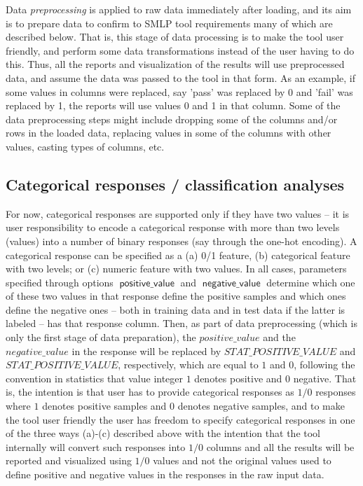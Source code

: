\documentclass[a4paper,parskip=half]{article} %
\newcommand*\option[1]{\operatorname{\mathsf{#1}}} %
\begin{document}
Data \emph{preprocessing} is applied to raw data immediately after loading, and its aim is to prepare
data to confirm to SMLP tool requirements many of which are described below. That is, this
stage of data processing is to make the tool user friendly, and perform some data 
transformations instead of the user having to do this. Thus, all the reports and visualization
of the results will use preprocessed data, and assume the data was passed to the tool in that
form. As an example, if some values in columns were replaced, say 'pass' was replaced by 0
and 'fail' was replaced by 1, the reports will use values 0 and 1 in that column. Some of the 
data preprocessing steps might include dropping some of the columns and/or rows in the loaded
data, replacing values in some of the columns with other values, casting types of columns, etc.

\subsection{Categorical responses / classification analyses}
For now, categorical responses are supported only if they have two values -- it is user 
responsibility to encode a categorical response with more than two levels (values) into
a number of binary responses (say through the one-hot encoding). 
A categorical response can be specified as a (a) 0/1 feature, (b) categorical feature with 
two levels; or (c) numeric feature with two values. In all cases, parameters specified through
options $\option{positive\_value}$ and $\option{negative\_value}$ determine which one of 
these two values in that
response define the positive samples and which ones define the negative ones -- both in 
training data and in test data if the latter is labeled -- has that response column. 
Then, as part of data preprocessing (which is only the first stage of data preparation),
the $positive\_value$ and the $negative\_value$ in the response will be replaced by 
$STAT\_POSITIVE\_VALUE$ and $STAT\_POSITIVE\_VALUE$, respectively, which are equal to $1$ and $0$, 
following the convention in statistics that value integer $1$ denotes positive and $0$ negative. 
That is, the intention is that user has to provide categorical responses as $1/0$ responses
where $1$ denotes positive samples and $0$ denotes negative samples, and to make the tool user
friendly the user has freedom to specify categorical responses in one of the three ways (a)-(c)
described above with the intention that the tool internally will convert such responses into
$1/0$ columns and all the results will be reported and visualized using $1/$0 values and not the
original values used to define positive and negative values in the responses in the raw input data.
\end{document}
